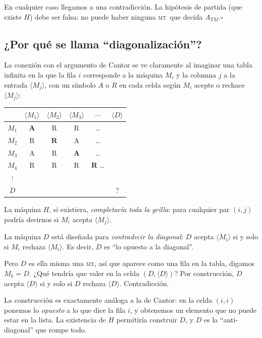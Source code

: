 \documentclass[11pt,a4paper]{article}
\theoremstyle{definicion}
\newcommand{\MT}{\textsc{mt}}
\newcommand{\enc}[1]{\langle #1 \rangle}
\begin{document}
En cualquier caso llegamos a una contradicción. La hipótesis de partida (que existe $H$) debe ser falsa: no puede haber ninguna \MT\ que decida $A_{TM}$.\hfill$\square$

\subsection{¿Por qué se llama ``diagonalización''?}

La conexión con el argumento de Cantor se ve claramente al imaginar una tabla infinita en la que la fila $i$ corresponde a la máquina $M_i$ y la columna $j$ a la entrada $\enc{M_j}$, con un símbolo $A$ o $R$ en cada celda según $M_i$ acepte o rechace $\enc{M_j}$:

\begin{center}
\begin{tabular}{c|ccccc}
& $\enc{M_1}$ & $\enc{M_2}$ & $\enc{M_3}$ & $\cdots$ & $\enc{D}$ \\
\hline
$M_1$ & $\mathbf{A}$ & R & R & \dots & \\
$M_2$ & R & $\mathbf{R}$ & A & \dots & \\
$M_3$ & A & R & $\mathbf{A}$ & \dots & \\
$M_4$ & R & R & R & $\mathbf{R}$ \dots & \\
$\vdots$ & & & & & \\
$D$ & & & & & $\mathbf{?}$ \\
\end{tabular}
\end{center}

La máquina $H$, si existiera, \emph{completaría toda la grilla}: para cualquier par $(i, j)$ podría decirnos si $M_i$ acepta $\enc{M_j}$.

La máquina $D$ está diseñada para \emph{contradecir la diagonal}: $D$ acepta $\enc{M_i}$ si y solo si $M_i$ rechaza $\enc{M_i}$. Es decir, $D$ es ``lo opuesto a la diagonal''.

Pero $D$ es ella misma una \MT, así que aparece como una fila en la tabla, digamos $M_k = D$. ¿Qué tendría que valer en la celda $(D, \enc{D})$? Por construcción, $D$ acepta $\enc{D}$ si y solo si $D$ rechaza $\enc{D}$. Contradicción.

\begin{intuicion}
La construcción es exactamente análoga a la de Cantor: en la celda $(i, i)$ ponemos lo \emph{opuesto} a lo que dice la fila $i$, y obtenemos un elemento que no puede estar en la lista. La existencia de $H$ permitiría construir $D$, y $D$ es la ``anti-diagonal'' que rompe todo.
\end{intuicion}
\end{document}

